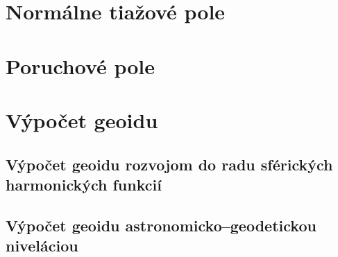 \documentclass[a4paper, 12pt]{book}
\begin{document}







\chapter{Normálne tiažové pole}








\chapter{Poruchové pole}








\chapter{Výpočet geoidu}







\section{Výpočet geoidu rozvojom do radu sférických harmonických funkcií}







\section{Výpočet geoidu astronomicko--geodetickou niveláciou}
\end{document}
